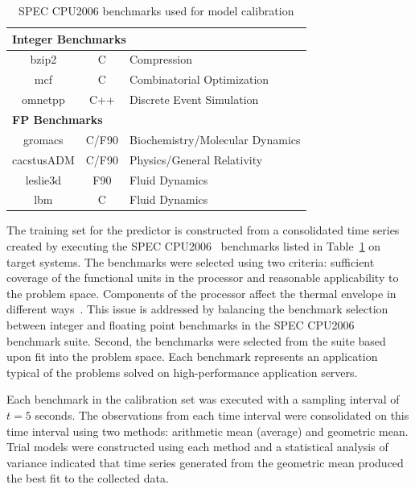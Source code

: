 \documentclass[acmtaco]{acmtrans2m}
\begin{document}
\begin{table}[t!]
  \centering
  \caption{SPEC CPU2006 benchmarks used for model calibration}
  \label{tab:specbenchs}
  \begin{tabular}{c c p{5cm}}
    \hline
    \multicolumn{3}{l}{\textbf{Integer Benchmarks}} \\
    \hline
    bzip2&C&Compression\\
    mcf&C&Combinatorial Optimization\\
    omnetpp&C++&Discrete Event Simulation\\
    \multicolumn{3}{l}{\textbf{FP Benchmarks}} \\
    \hline
    gromacs&C/F90&Biochemistry/Molecular Dynamics\\
    cacstusADM&C/F90&Physics/General Relativity\\
    leslie3d&F90&Fluid Dynamics\\
    lbm&C&Fluid Dynamics\\
    \hline
  \end{tabular}
\end{table}
The training set for the predictor is constructed from a consolidated
time series created by executing the SPEC CPU2006~\cite{spec2006}
benchmarks listed in Table~\ref{tab:specbenchs} on target systems.  The
benchmarks were selected using two criteria: sufficient coverage of the
functional units in the processor and reasonable applicability to the
problem space.  Components of the processor affect the thermal envelope
in different ways~\cite{Kumar2008}.  This issue is addressed by
balancing the benchmark selection between integer and floating point
benchmarks in the SPEC CPU2006 benchmark suite.  Second, the benchmarks
were selected from the suite based upon fit into the problem space.
Each benchmark represents an application typical of the problems solved
on high-performance application servers.  

Each benchmark in the calibration set was executed with a sampling
interval of $t=5$ seconds.  The observations from each time interval
were consolidated on this time interval using two methods: arithmetic
mean (average) and geometric mean.  Trial models were constructed using
each method and a statistical analysis of variance indicated that time
series generated from the geometric mean
produced the best fit to the collected data.
   
\end{document}

